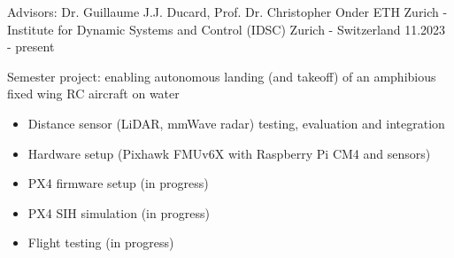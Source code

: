 
\begin{cventries}
    \cventry
        {Advisors: Dr. Guillaume J.J. Ducard, Prof. Dr. Christopher Onder}
        {ETH Zurich - Institute for Dynamic Systems and Control (IDSC)}
        {Zurich - Switzerland}
        {11.2023 - present}
        {
        \begin{cvitems}
            \item Semester project: enabling autonomous landing (and takeoff) of an amphibious fixed wing RC aircraft on water
            \begin{itemize}
                \item Distance sensor (LiDAR, mmWave radar) testing, evaluation and integration
                \item Hardware setup (Pixhawk FMUv6X with Raspberry Pi CM4 and sensors)
                \item PX4 firmware setup (in progress)
                \item PX4 SIH simulation (in progress)
                \item Flight testing (in progress)
            \end{itemize}
        \end{cvitems}
    }
\end{cventries}